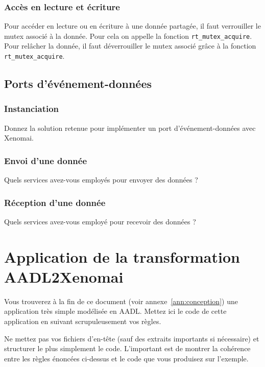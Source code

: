 \documentclass[11pt, a4paper]{paper}
\begin{document}
\subsubsection{Accès en lecture et écriture}
 {\color{black} Pour accéder en lecture ou en écriture à une donnée partagée, il faut verrouiller le mutex associé à la donnée. Pour cela on appelle la fonction {\tt rt\_mutex\_acquire}. Pour relâcher la donnée, il faut déverrouiller le mutex associé grâce à la fonction {\tt rt\_mutex\_acquire}. }

\subsection{Ports d’événement-données}

\subsubsection{Instanciation}
 {\color{blue} Donnez la solution retenue pour implémenter un port d'événement-données avec Xenomai.}

\subsubsection{Envoi d’une donnée}
 {\color{blue} Quels services avez-vous employés pour envoyer des données ?}

\subsubsection{Réception d’une donnée}
 {\color{blue} Quels services avez-vous employé pour recevoir des données ?}

\section{Application de la transformation AADL2Xenomai}

{\color{blue} Vous trouverez à la fin de ce document (voir annexe~\ref{ann:conception}) une application très simple modélisée en AADL. Mettez ici le code de cette application en suivant scrupuleusement vos règles.

Ne mettez pas vos fichiers d'en-tête (sauf des extraits importants si nécessaire) et structurer le plus simplement le code. L'important est de montrer la cohérence entre les règles énoncées ci-dessus et le code que vous produisez sur l'exemple.}
\end{document}
